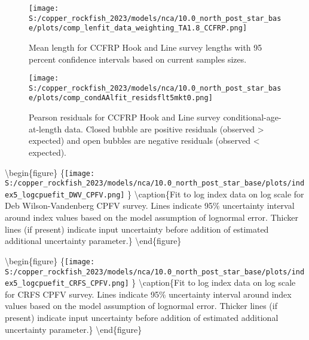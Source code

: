 \documentclass[11pt,
  letterpaper,
]{article}
\begin{document}
\begin{figure}
{\centering
\texttt{[image: S:/copper\_rockfish\_2023/models/nca/10.0\_north\_post\_star\_base/plots/comp\_lenfit\_data\_weighting\_TA1.8\_CCFRP.png]}
}
\caption{Mean length for CCFRP Hook and Line survey lengths with 95 percent confidence intervals based on current samples sizes.\label{fig:ccfrp-mean-len-fit}}
\end{figure}

\pagebreak

\begin{figure}
{\centering
\texttt{[image: S:/copper\_rockfish\_2023/models/nca/10.0\_north\_post\_star\_base/plots/comp\_condAAlfit\_residsflt5mkt0.png]}
}
\caption{Pearson residuals for CCFRP Hook and Line survey conditional-age-at-length data. Closed bubble are positive residuals (observed > expected) and open bubbles are negative residuals (observed < expected).\label{fig:ccfrp-age-pearson}}
\end{figure}

\pagebreak

\pagebreak

\pagebreak

\pagebreak

\textbackslash begin\{figure\} \{\centering \texttt{[image: S:/copper\_rockfish\_2023/models/nca/10.0\_north\_post\_star\_base/plots/index5\_logcpuefit\_DWV\_CPFV.png]} \} \textbackslash caption\{Fit to log index data on log scale for Deb Wilson-Vandenberg CPFV survey. Lines indicate 95\% uncertainty interval around index values based on the model assumption of lognormal error. Thicker lines (if present) indicate input uncertainty before addition of estimated additional uncertainty parameter.\label{fig:dwv-cpfv-index-fit}\} \textbackslash end\{figure\}

\pagebreak

\textbackslash begin\{figure\} \{\centering \texttt{[image: S:/copper\_rockfish\_2023/models/nca/10.0\_north\_post\_star\_base/plots/index5\_logcpuefit\_CRFS\_CPFV.png]} \} \textbackslash caption\{Fit to log index data on log scale for CRFS CPFV survey. Lines indicate 95\% uncertainty interval around index values based on the model assumption of lognormal error. Thicker lines (if present) indicate input uncertainty before addition of estimated additional uncertainty parameter.\label{fig:crfs-cpfv-index-fit}\} \textbackslash end\{figure\}
\end{document}
